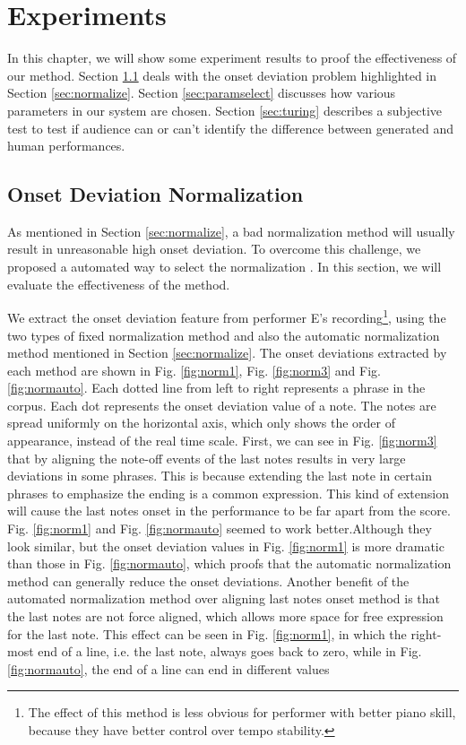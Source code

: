 \chapter{Experiments}
\label{chap:exp}
In this chapter, we will show some experiment results to proof the effectiveness of our method. Section \ref{sec:onsetnormexp} deals with the onset deviation problem highlighted in Section \ref{sec:normalize}. Section \ref{sec:paramselect} discusses how various parameters in our system are chosen. Section \ref{sec:turing} describes a subjective test to test if audience can or can't identify the difference between generated and human performances.


\section{Onset Deviation Normalization}
\label{sec:onsetnormexp}
As mentioned in Section \ref{sec:normalize}, a bad normalization method will usually result in unreasonable high onset deviation. To overcome this challenge, we proposed a automated way to select the normalization . In this section, we will evaluate the effectiveness of the method. 

We extract the onset deviation feature from performer E's recording\footnote{The effect of this method is less obvious for performer with better piano skill, because they have better control over tempo stability.}, using the two types of fixed normalization method and also the automatic normalization method mentioned in Section \ref{sec:normalize}. The onset deviations extracted by each method are shown in Fig. \ref{fig:norm1}, Fig. \ref{fig:norm3} and Fig. \ref{fig:normauto}. Each dotted line from left to right represents a phrase in the corpus. Each dot represents the onset deviation value of a note. The notes are spread uniformly  on the horizontal axis, which only shows the order of appearance, instead of the real time scale. First, we can see in Fig. \ref{fig:norm3} that by aligning the note-off events of the last notes results in very large deviations in some phrases. This is because extending the last note in certain phrases to emphasize the ending is a common expression. This kind of extension will cause the last notes onset in the performance to be far apart from the score. Fig. \ref{fig:norm1} and Fig. \ref{fig:normauto} seemed to work better.Although they look similar, but the onset deviation values in Fig. \ref{fig:norm1} is more dramatic than those in Fig. \ref{fig:normauto}, which proofs that the automatic normalization method can generally reduce the onset deviations. Another benefit of the automated normalization method over aligning last notes onset method is that the last notes are not force aligned, which allows more space for free expression for the last note. This effect can be seen in Fig. \ref{fig:norm1}, in which the right-most end of a line, i.e. the last note, always goes back to zero, while in Fig. \ref{fig:normauto}, the end of a line can end in different values


